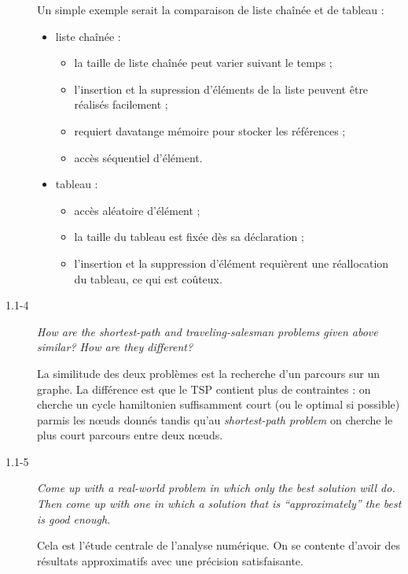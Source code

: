 \begin{description}
    \begin{ex}
        Un simple exemple serait la comparaison de liste cha\^in\'ee et de tableau :
        \begin{itemize}
          \item liste cha\^in\'ee :
            \begin{itemize}
              \item[\cmark] la taille de liste cha\^in\'ee peut varier suivant le temps ;
              \item[\cmark] l'insertion et la supression d'\'el\'ements de la liste peuvent \^etre r\'ealis\'es facilement ;
              \item[\xmark] requiert davatange m\'emoire pour stocker les r\'ef\'erences ;
              \item[\xmark] acc\`es s\'equentiel d'\'el\'ement.
            \end{itemize}
          \item tableau :
            \begin{itemize}
              \item[\cmark] acc\`es al\'eatoire d'\'el\'ement ;
              \item[\xmark] la taille du tableau est fix\'ee d\`es sa d\'eclaration ;
              \item[\xmark] l'insertion et la suppression d'\'el\'ement requi\`erent une r\'eallocation du tableau, ce qui est co\^uteux.
            \end{itemize}
        \end{itemize}
    \end{ex}

  \item[1.1-4] {\itshape How are the shortest-path and traveling-salesman problems given above similar? How are they different?}

    \begin{ex}
      La similitude des deux probl\`emes est la recherche d'un parcours sur un graphe. La diff\'erence est que le TSP contient plus       de contraintes : on cherche un cycle hamiltonien suffisamment court (ou le optimal si possible) parmis les n\oe uds donn\'es tandis qu'au {\it shortest-path problem} on cherche le plus court parcours entre deux n\oe uds. \mbox{}
    \end{ex}

  \item[1.1-5] {\itshape Come up with a real-world problem in which only the best solution will do. Then come up with one in which a solution that is “approximately” the best is good enough.}

    \begin{ex}
      Cela est l'\'etude centrale de l'analyse num\'erique. On se contente d'avoir des r\'esultats approximatifs avec une pr\'ecision satisfaisante.
    \end{ex}

\end{description}

